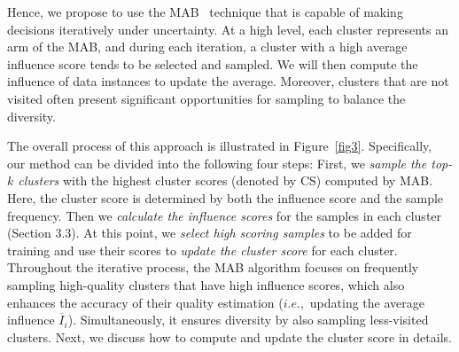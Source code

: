 \documentclass{article} %
\begin{document}
Hence, we propose to use the MAB~\citep{vermorel2005multi} technique that is capable of making decisions iteratively under uncertainty. At a high level, each cluster represents an arm of the MAB, and during each iteration, a cluster with a high average influence score tends to be selected and sampled. We will then compute the influence of data instances to update the average. Moreover, clusters that are not visited often present significant opportunities for sampling to balance the diversity.





The overall process of this approach is illustrated in Figure~\ref{fig3}. Specifically, our method can be divided into the following four steps: First, we \textit{sample the top-$k$ clusters} with the highest cluster scores (denoted by CS) computed by MAB. 
Here, the cluster score is determined by both the influence score and the sample frequency.
Then we \textit{calculate the influence scores} for the samples in each cluster (Section 3.3). At this point, we \textit{select  high scoring samples} to be added for training and use their scores to \textit{update the cluster score} for each cluster.
%
Throughout the iterative process, the MAB algorithm focuses on frequently sampling high-quality clusters that have high influence scores, which also  enhances the accuracy of their quality estimation ($i.e.,$ updating the average influence $\overline{I}_i$). Simultaneously, it ensures diversity by also sampling less-visited clusters.
Next, we discuss how to compute and update the cluster score in details.

\end{document}
